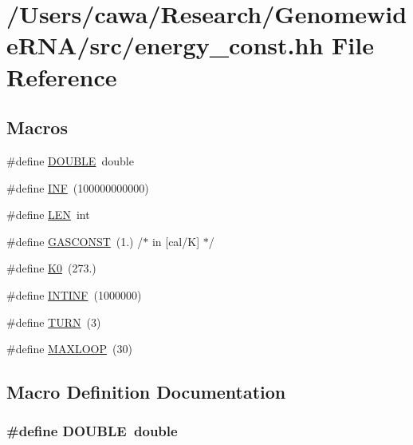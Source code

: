 \hypertarget{energy__const_8hh}{\section{/\+Users/cawa/\+Research/\+Genomewide\+R\+N\+A/src/energy\+\_\+const.hh File Reference}
\label{energy__const_8hh}
}
\subsection*{Macros}
\begin{DoxyCompactItemize}
\item 
\#define \hyperlink{energy__const_8hh_a8747af38b86aa2bbcda2f1b1aa0888c2}{D\+O\+U\+B\+L\+E}~double
\item 
\#define \hyperlink{energy__const_8hh_a12c2040f25d8e3a7b9e1c2024c618cb6}{I\+N\+F}~(100000000000)
\item 
\#define \hyperlink{energy__const_8hh_a05b49c662c073f89e86804f7856622a0}{L\+E\+N}~int
\item 
\#define \hyperlink{energy__const_8hh_ab1e4a8d82f24ed5db01dde5f25269cf1}{G\+A\+S\+C\+O\+N\+S\+T}~(1.)  /$\ast$ in \mbox{[}cal/K\mbox{]} $\ast$/
\item 
\#define \hyperlink{energy__const_8hh_a307c72605e3713972b4f4fb2d53ea20e}{K0}~(273.)
\item 
\#define \hyperlink{energy__const_8hh_a0394650c03180f81bb6faa14a89201dc}{I\+N\+T\+I\+N\+F}~(1000000)
\item 
\#define \hyperlink{energy__const_8hh_ae646250fd59311356c7e5722a81c3a96}{T\+U\+R\+N}~(3)
\item 
\#define \hyperlink{energy__const_8hh_ad1bd6eabac419670ddd3c9ed82145988}{M\+A\+X\+L\+O\+O\+P}~(30)
\end{DoxyCompactItemize}


\subsection{Macro Definition Documentation}
\hypertarget{energy__const_8hh_a8747af38b86aa2bbcda2f1b1aa0888c2}{
\subsubsection[{D\+O\+U\+B\+L\+E}]{\setlength{\rightskip}{0pt plus 5cm}\#define D\+O\+U\+B\+L\+E~double}}\label{energy__const_8hh_a8747af38b86aa2bbcda2f1b1aa0888c2}


